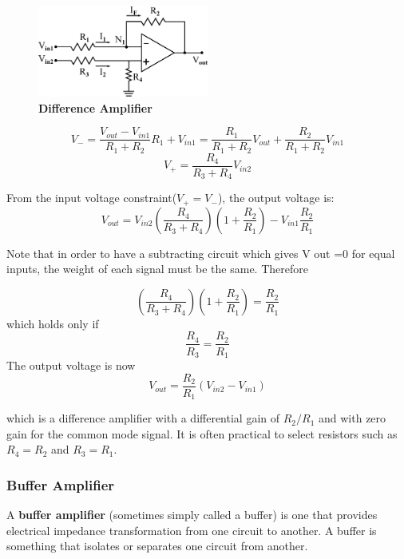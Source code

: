 \documentclass[a4 paper]{article}
\numberwithin{equation}{section}
\newcommand{\0}{\mathbf{0}}
\begin{document}
\begin{figure}[!ht]
  \centering
  \includegraphics[width=0.5\textwidth]{./images/differenceamp}
  \caption{{\bf Difference Amplifier}}
\end{figure}

\begin{equation}
V_- = \frac{V_{out}-V_{in1}}{R_1+R_2}R_1 + V_{in1} = \frac{R_1}{R_1 + R_2}V_{out} + \frac{R_2}{R_1 + R_2}V_{in1}
\end{equation}
\begin{equation}
V_+ = \frac{R_4}{R_3 + R_4}V_{in2}
\end{equation}

From the input voltage constraint($V_+ = V_-$), the output voltage is:
\begin{equation}
V_{out} = V_{in2}(\frac{R_4}{R_3+R_4})(1+\frac{R_2}{R_1})-V_{in1}\frac{R_2}{R_1}
\end{equation}

Note that in order to have a subtracting circuit which gives V out =0 for equal inputs, the weight of each signal must be the same. Therefore

\begin{equation}
(\frac{R_4}{R_3 + R_4})(1 + \frac{R_2}{R_1}) = \frac{R_2}{R_1}
\end{equation}
which holds only if
\begin{equation}
\frac{R_4}{R_3} = \frac{R_2}{R_1}
\end{equation}
The output voltage is now
\begin{equation}
V_{out} = \frac{R_2}{R_1}(V_{in2} - V_{in1})
\end{equation}

which is a difference amplifier with a differential gain of $R_2/R_1$ and with zero gain for the common mode signal. It is often practical to select resistors such as $R_4=R_2$ and $R_3=R_1$.


\subsubsection{Buffer Amplifier}
A {\bf buffer amplifier} (sometimes simply called a buffer) is one that provides electrical impedance transformation from one circuit to another. A buffer is something that isolates or separates one circuit from another. 
\end{document}
